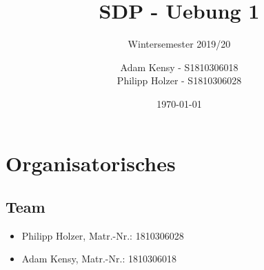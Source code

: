 


\title{SDP - Uebung 1} %
\subtitle{Wintersemester 2019/20} %
\author{Adam Kensy - S1810306018\\
		Philipp Holzer - S1810306028} %
\date{\today}

\maketitle %

\newpage
\tableofcontents %
\newpage


\section{Organisatorisches}

\subsection{Team}
\begin{itemize}
	\item Philipp Holzer, Matr.-Nr.: 1810306028
	\item Adam Kensy, Matr.-Nr.: 1810306018
\end{itemize}

